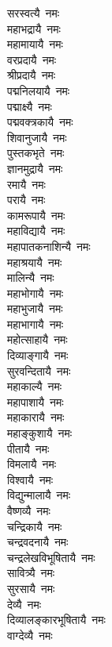 \begin{multicols}{2}
\begin{flushleft}
सरस्वत्यै~नमः\\
महाभद्रायै~नमः\\
महामायायै~नमः\\
वरप्रदायै~नमः\\
श्रीप्रदायै~नमः\\
पद्मनिलयायै~नमः\\
पद्माक्ष्यै~नमः\\
पद्मवक्त्रकायै~नमः\\
शिवानुजायै~नमः\\
पुस्तकभृते~नमः\hfill{}\\
ज्ञानमुद्रायै~नमः\\
रमायै~नमः\\
परायै~नमः\\
कामरूपायै~नमः\\
महाविद्यायै~नमः\\
महापातकनाशिन्यै~नमः\\
महाश्रयायै~नमः\\
मालिन्यै~नमः\\
महाभोगायै~नमः\\
महाभुजायै~नमः\hfill{}\\
महाभागायै~नमः\\
महोत्साहायै~नमः\\
दिव्याङ्गायै~नमः\\
सुरवन्दितायै~नमः\\
महाकाल्यै~नमः\\
महापाशायै~नमः\\
महाकारायै~नमः\\
महाङ्कुशायै~नमः\\
पीतायै~नमः\\
विमलायै~नमः\hfill{}\\
विश्वायै~नमः\\
विद्युन्मालायै~नमः\\
वैष्णव्यै~नमः\\
चन्द्रिकायै~नमः\\
चन्द्रवदनायै~नमः\\
चन्द्रलेखविभूषितायै~नमः\\
सावित्र्यै~नमः\\
सुरसायै~नमः\\
देव्यै~नमः\\
दिव्यालङ्कारभूषितायै~नमः\hfill{}\\
वाग्देव्यै~नमः\\

\end{flushleft}
\end{multicols}
